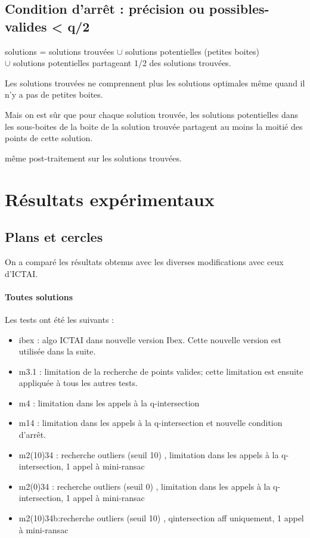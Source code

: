 \documentclass{article}
\begin{document}
 \subsection {Condition d'arr\^et :  pr\'ecision ou   possibles-valides < q/2}

       solutions = solutions trouv\'ees  $\cup$ solutions potentielles (petites boites) \\
                                       $\cup$ solutions potentielles partageant 1/2 des solutions trouv\'ees.

       Les solutions trouv\'ees ne comprennent plus les solutions optimales m\^eme quand il n'y a pas
de petites boites.

       Mais on est s\^ur que pour chaque solution trouv\'ee, les solutions potentielles dans les sous-boites de la
       boite de la solution trouv\'ee partagent  au moins la moiti\'e des points de cette solution.


      m\^eme post-traitement sur les solutions trouv\'ees.


\section{R\'esultats exp\'erimentaux}


\subsection{Plans et cercles}
On a compar\'e les r\'esultats obtenus avec les diverses modifications avec ceux d'ICTAI.

\paragraph{Toutes solutions}
Les tests ont \'et\'e les suivants :

\begin{itemize}
\item{ibex}  : algo ICTAI dans nouvelle version Ibex.  Cette nouvelle version est utilis\'ee dans la suite.
\item{m3.1} : limitation de la recherche de points valides; 
cette limitation est ensuite appliqu\'ee \`a tous les autres tests.
\item{m4} : limitation dans les appels \`a la q-intersection
\item{m14} : limitation dans les appels \`a la q-intersection et nouvelle condition d'arr\^et.

\item{m2(10)34}  : recherche outliers (seuil 10) , limitation dans les appels \`a la q-intersection, 1 appel \`a mini-ransac
\item{m2(0)34}  : recherche outliers (seuil 0) , limitation dans les appels \`a la q-intersection, 1 appel \`a mini-ransac
\item{m2(10)34b}:recherche outliers (seuil 10) , qintersection aff uniquement, 1 appel \`a mini-ransac
\end{itemize}
\end{document}
